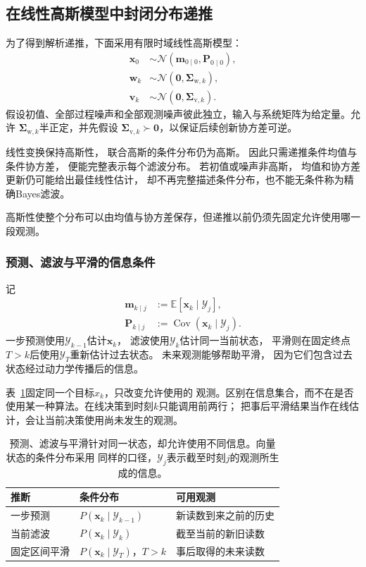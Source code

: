\subsection{在线性高斯模型中封闭分布递推}
\label{sec:dynamical-kalman-rts}

为了得到解析递推，下面采用有限时域线性高斯模型：
\begin{align*}
	\bm{x}_{0} & \sim \mathcal{N}(\bm{m}_{0\mid0},\bm{P}_{0\mid0}), \\
	\bm{w}_{k} & \sim \mathcal{N}(\bm{0},\bm{\Sigma}_{\mathrm{w},k}),               \\
	\bm{v}_{k} & \sim \mathcal{N}(\bm{0},\bm{\Sigma}_{\mathrm{v},k}).
\end{align*}
假设初值、全部过程噪声和全部观测噪声彼此独立，输入与系统矩阵为给定量。允许
$\bm{\Sigma}_{\mathrm{w},k}$半正定，并先假设
$\bm{\Sigma}_{\mathrm{v},k}\succ\bm{0}$，以保证后续创新协方差可逆。

线性变换保持高斯性， 联合高斯的条件分布仍为高斯。 因此只需递推条件均值与条件协方差，
便能完整表示每个滤波分布。 若初值或噪声非高斯， 均值和协方差更新仍可能给出最佳线性估计，
却不再完整描述条件分布，也不能无条件称为精确Bayes滤波。

高斯性使整个分布可以由均值与协方差保存，但递推以前仍须先固定允许使用哪一段观测。

\subsubsection{预测、滤波与平滑的信息条件}

记
\begin{align*}
	\bm{m}_{k\mid j} & := \mathbb{E}[\bm{x}_{k}\mid\mathcal{Y}_{j}],         \\
	\bm{P}_{k\mid j} & := \operatorname{Cov}(\bm{x}_{k}\mid\mathcal{Y}_{j}).
\end{align*}
一步预测使用$\mathcal{Y}_{k-1}$估计$\bm{x}_{k}$， 滤波使用$\mathcal{Y}_{k}$估计同一当前状态，
平滑则在固定终点$T>k$后使用$\mathcal{Y}_{T}$重新估计过去状态。
未来观测能够帮助平滑， 因为它们包含过去状态经过动力学传播后的信息。

表~\ref{tab:dynamical-estimation-information}固定同一个目标$x_k$，只改变允许使用的
观测。区别在信息集合，而不在是否使用某一种算法。在线决策到时刻$k$只能调用前两行；
把事后平滑结果当作在线估计，会让当前决策使用尚未发生的观测。

\begin{table}[htbp]
  \centering
  \begin{tabularx}{\linewidth}{lXX}
    \toprule
    推断 & 条件分布 & 可用观测\\
    \midrule
    一步预测 & $P(\bm{x}_k\mid\mathcal Y_{k-1})$ & 新读数到来之前的历史\\
    当前滤波 & $P(\bm{x}_k\mid\mathcal Y_k)$ & 截至当前的新旧读数\\
    固定区间平滑 & $P(\bm{x}_k\mid\mathcal Y_T)$，$T>k$ & 事后取得的未来读数\\
    \bottomrule
  \end{tabularx}
  \caption{预测、滤波与平滑针对同一状态，却允许使用不同信息。向量状态的条件分布采用
  同样的口径，$\mathcal Y_j$表示截至时刻$j$的观测所生成的信息。}
  \label{tab:dynamical-estimation-information}
\end{table}


